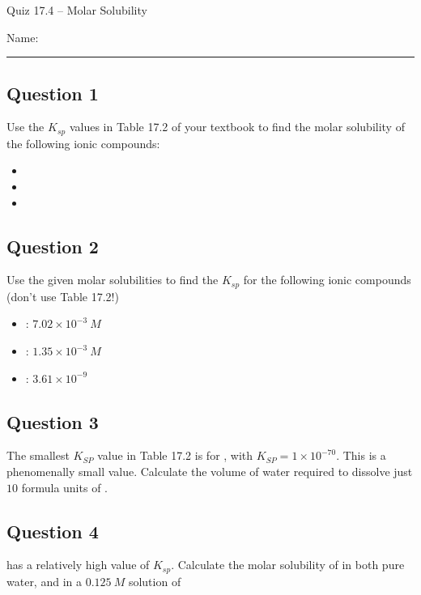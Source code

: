 \documentclass[11pt, letterpaper]{memoir}
\begin{document}
	\begin{center}
		{\large	Quiz 17.4 -- Molar Solubility}
	\end{center}
	{\large Name: \rule[-1mm]{4in}{.1pt} 

\subsection*{Question 1}
Use the $K_{sp}$ values in Table 17.2 of your textbook to find the molar solubility of the following ionic compounds:
\begin{itemize}
	\item {}
	
	\vspace{2em}
	\item {}
	
	\vspace{2em}
	\item {}
\end{itemize}

\vspace{1em}
\subsection*{Question 2}
Use the given molar solubilities to find the $K_{sp}$ for the following ionic compounds (don't use Table 17.2!)
\begin{itemize}
	\item {} : $7.02\times10^{-3}~M$
	
	\vspace{2em}
	\item {} : $1.35\times10^{-3}~M$
	
	\vspace{2em}
	\item {} : $3.61\times10^{-9}$
	
\end{itemize}

\vspace{1em}
\subsection*{Question 3}
The smallest $K_{SP}$ value in Table 17.2 is for , with $K_{SP}=1\times10^{-70}$. This is a phenomenally small value. Calculate the volume of water required to dissolve just $10$ formula units of . 

\vspace{4em}
\subsection*{Question 4}
 has a relatively high value of $K_{sp}$. Calculate the molar solubility of  in both pure water, and in a $0.125~M$ solution of 

}
\end{document}
